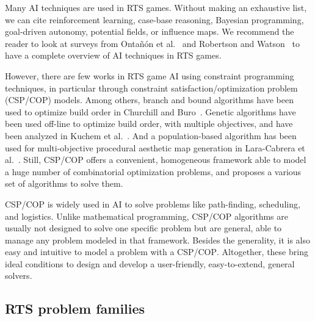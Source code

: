 \documentclass[journal]{IEEEtran}
\newcommand{\csp}{\textsc{CSP}\xspace}
\newcommand{\cop}{\textsc{COP}\xspace}
\begin{document}
Many AI techniques are used in RTS games. Without making an exhaustive
list,  we  can  cite   reinforcement  learning,  case-base  reasoning,
Bayesian programming, goal-driven autonomy,  potential fields, or influence maps. We
recommend  the  reader to  look  at  surveys from  Onta{\~n}{\'o}n  et
al.~\cite{OntanonSURCM13} and Robertson and Watson~\cite{RobertsonW14}
to have a complete overview of AI techniques in RTS games.

However,  there  are  few  works  in  RTS  game  AI  using  constraint
programming    techniques,    in   particular    through    constraint
satisfaction/optimization problem  (\csp/\cop) models.   Among others,
branch and bound algorithms have been  used to optimize build order in
Churchill and Buro~\cite{ChurchillB11}.   Genetic algorithms have been
used off-line to  optimize build order, with  multiple objectives, and
have  been   analyzed  in   Kuchem  et  al.~\cite{KuchemPR13}.   And  a
population-based   algorithm  has   been   used  for   multi-objective
procedural    aesthetic   map    generation    in   Lara-Cabrera    et
al.~\cite{LaraCF14}.    Still,   \csp/\cop    offers   a   convenient,
homogeneous framework able to model a huge number of combinatorial optimization problems,  and proposes  a various  set of  algorithms to
solve them.

\csp/\cop is widely used in  AI to solve problems
like  path-finding, scheduling,  and  logistics.  Unlike  mathematical
programming, \csp/\cop  algorithms are  usually not designed  to solve
one  specific problem  but are  general, able  to manage  any problem
modeled in that framework. Besides the generality, it is also easy and
intuitive  to model  a problem  with a  \csp/\cop.  Altogether,  these
bring  ideal  conditions  to   design  and  develop  a  user-friendly,
easy-to-extend, general solvers.


\subsection{RTS problem families}
\end{document}
